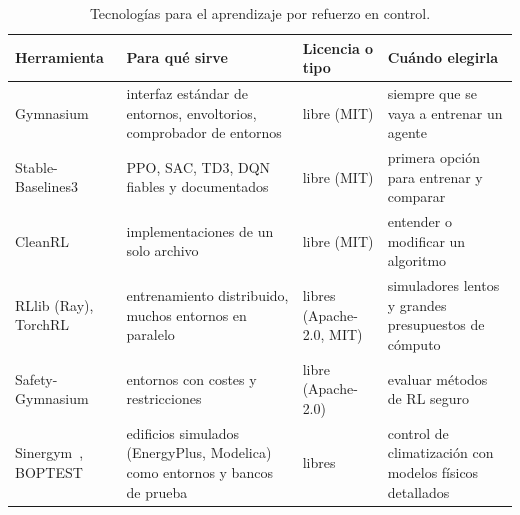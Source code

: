 \begin{table}[htbp]
\centering\footnotesize
\begin{tabularx}{\textwidth}{@{}>{\raggedright\arraybackslash}p{3.1cm}>{\raggedright\arraybackslash}X>{\raggedright\arraybackslash}p{2.0cm}>{\raggedright\arraybackslash}X@{}}
\toprule
Herramienta & Para qué sirve & Licencia o tipo & Cuándo elegirla \\
\midrule
Gymnasium~\cite{gymnasium} & interfaz estándar de entornos, envoltorios, comprobador de entornos & libre (MIT) & siempre que se vaya a entrenar un agente \\
Stable-Baselines3~\cite{sb3} & PPO, SAC, TD3, DQN fiables y documentados & libre (MIT) & primera opción para entrenar y comparar \\
CleanRL & implementaciones de un solo archivo & libre (MIT) & entender o modificar un algoritmo \\
RLlib (Ray), TorchRL & entrenamiento distribuido, muchos entornos en paralelo & libres (Apache-2.0, MIT) & simuladores lentos y grandes presupuestos de cómputo \\
Safety-Gymnasium & entornos con costes y restricciones & libre (Apache-2.0) & evaluar métodos de RL seguro \\
Sinergym~\cite{sinergym}, BOPTEST~\cite{boptest} & edificios simulados (EnergyPlus, Modelica) como entornos y bancos de prueba & libres & control de climatización con modelos físicos detallados \\
\bottomrule
\end{tabularx}
\caption{Tecnologías para el aprendizaje por refuerzo en control.}
\label{tab:tec4}
\end{table}

\addtocounter{definicion}{1}%

